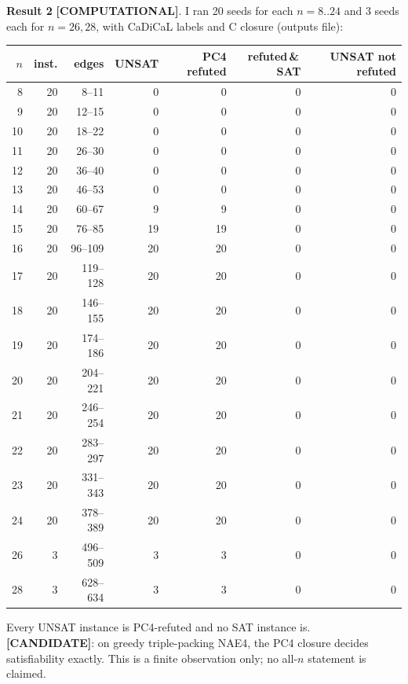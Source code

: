 \documentclass[11pt]{article}
\theoremstyle{remark}
\newcommand{\lab}[1]{\textbf{[#1]}}
\begin{document}
\textbf{Result 2} \lab{COMPUTATIONAL}. I ran 20 seeds for each $n=8..24$ and 3 seeds each for
$n=26,28$, with CaDiCaL labels and C closure (outputs file):
\begin{center}
\begin{tabular}{rrrrrrr}
\toprule
$n$ & inst. & edges & UNSAT & PC4 refuted & refuted\,\&\,SAT & UNSAT not refuted\\
\midrule
8 & 20 & 8--11 & 0 & 0 & 0 & 0\\
9 & 20 & 12--15 & 0 & 0 & 0 & 0\\
10 & 20 & 18--22 & 0 & 0 & 0 & 0\\
11 & 20 & 26--30 & 0 & 0 & 0 & 0\\
12 & 20 & 36--40 & 0 & 0 & 0 & 0\\
13 & 20 & 46--53 & 0 & 0 & 0 & 0\\
14 & 20 & 60--67 & 9 & 9 & 0 & 0\\
15 & 20 & 76--85 & 19 & 19 & 0 & 0\\
16 & 20 & 96--109 & 20 & 20 & 0 & 0\\
17 & 20 & 119--128 & 20 & 20 & 0 & 0\\
18 & 20 & 146--155 & 20 & 20 & 0 & 0\\
19 & 20 & 174--186 & 20 & 20 & 0 & 0\\
20 & 20 & 204--221 & 20 & 20 & 0 & 0\\
21 & 20 & 246--254 & 20 & 20 & 0 & 0\\
22 & 20 & 283--297 & 20 & 20 & 0 & 0\\
23 & 20 & 331--343 & 20 & 20 & 0 & 0\\
24 & 20 & 378--389 & 20 & 20 & 0 & 0\\
26 & 3 & 496--509 & 3 & 3 & 0 & 0\\
28 & 3 & 628--634 & 3 & 3 & 0 & 0\\
\bottomrule
\end{tabular}

\end{center}
Every UNSAT instance is PC4-refuted and no SAT instance is. \lab{CANDIDATE}: on greedy
triple-packing NAE4, the PC4 closure decides satisfiability exactly. This is a finite
observation only; no all-$n$ statement is claimed.
\end{document}
